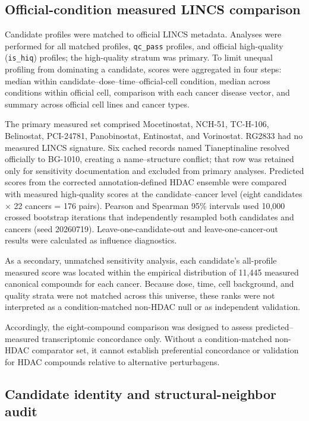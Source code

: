 \subsection{Official-condition measured LINCS comparison}

Candidate profiles were matched to official LINCS metadata. Analyses were performed for all matched profiles, \texttt{qc\_pass} profiles, and official high-quality (\texttt{is\_hiq}) profiles; the high-quality stratum was primary. To limit unequal profiling from dominating a candidate, scores were aggregated in four steps: median within candidate--dose--time--official-cell condition, median across conditions within official cell, comparison with each cancer disease vector, and summary across official cell lines and cancer types.

The primary measured set comprised Mocetinostat, NCH-51, TC-H-106, Belinostat, PCI-24781, Panobinostat, Entinostat, and Vorinostat. RG2833 had no measured LINCS signature. Six cached records named Tianeptinaline resolved officially to BG-1010, creating a name--structure conflict; that row was retained only for sensitivity documentation and excluded from primary analyses. Predicted scores from the corrected annotation-defined HDAC ensemble were compared with measured high-quality scores at the candidate--cancer level (eight candidates $\times$ 22 cancers = 176 pairs). Pearson and Spearman 95\% intervals used 10,000 crossed bootstrap iterations that independently resampled both candidates and cancers (seed 20260719). Leave-one-candidate-out and leave-one-cancer-out results were calculated as influence diagnostics.

As a secondary, unmatched sensitivity analysis, each candidate's all-profile measured score was located within the empirical distribution of 11,445 measured canonical compounds for each cancer. Because dose, time, cell background, and quality strata were not matched across this universe, these ranks were not interpreted as a condition-matched non-HDAC null or as independent validation.

\begin{roundtworevision}
Accordingly, the eight-compound comparison was designed to assess predicted--measured transcriptomic concordance only. Without a condition-matched non-HDAC comparator set, it cannot establish preferential concordance or validation for HDAC compounds relative to alternative perturbagens.
\end{roundtworevision}

\subsection{Candidate identity and structural-neighbor audit}

